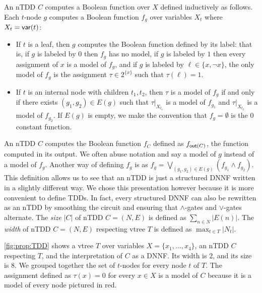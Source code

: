 \documentclass[a4paper,UKenglish,cleveref, autoref, thm-restate]{lipics-v2021}
\newcommand{\florent}[1]{\todo[color=green]{Florent: #1}}
\newcommand{\guy}[1]{\todo[color=purple]{\color{white}{{\bf Guy}: #1}}}
\begin{document}
An nTDD $C$ computes a Boolean function over $X$ defined inductively as follows. Each $t$-node $g$ computes a Boolean function $f_g$ over variables $X_t$ where $X_t = \mathsf{var}(t)$:
\begin{itemize}
\item If $t$ is a leaf, then $g$ computes the Boolean function defined by its label: that is, if $g$ is labeled by $0$ then $f_g$ has no model, if $g$ is labeled by $1$ then every assignment of $x$ is a model of $f_g$, and if $g$ is labeled by $\ell \in \{x,\neg x\}$, the only model of $f_g$ is the assignment $\tau \in 2^{\{x\}}$ such that $\tau(\ell)=1$. 
\item If $t$ is an internal node with children $t_1,t_2$, then $\tau$ is a model of $f_g$ if and only if there exists $(g_1,g_2) \in E(g)$ such that $\tau|_{X_{t_1}}$ is a model of $f_{g_1}$ and $\tau|_{X_{t_2}}$ is a model of $f_{g_2}$. If $E(g)$ is empty, we make the convention that $f_g=\emptyset$ is the $0$ constant function.
\end{itemize}
%
An nTDD $C$ computes the Boolean function $f_C$ defined as $f_{\out}$, the function computed in its output. We often abuse notation and say a model of $g$ instead of a model of $f_g$.
Another way of defining $f_g$ is as $f_g = \bigvee_{(g_1,g_2) \in E(g)} (f_{g_1} \wedge f_{g_2})$. This definition allows us to see that an nTDD is just a structured DNNF written in a slightly different way. We chose this presentation however because it is more convenient to define TDDs. In fact, every structured DNNF can also be rewritten as an nTDD by smoothing the circuit and ensuring that $\wedge$-gates and $\vee$-gates alternate. The \emph{size} $|C|$ of nTDD $C=(N,E)$ is defined as $\sum_{n \in N} |E(n)|$. The \emph{width} of nTDD $C=(N,E)$ respecting vtree $T$ is defined as $\max_{t \in T} |N_t|$.  

  \cref{fig:prop:TDD} shows a vtree $T$ over variables $X = \{x_1,\dots,x_4\}$, an nTDD $C$ respecting $T$, and the interpretation of $C$ as a DNNF. Its width is $2$, and its size is $8$. We grouped together the set of $t$-nodes for every node $t$ of $T$. The assignment defined as $\tau(x)=0$ for every $x \in X$ is a model of $C$ because it is a model of every node pictured in red. 
\end{document}
